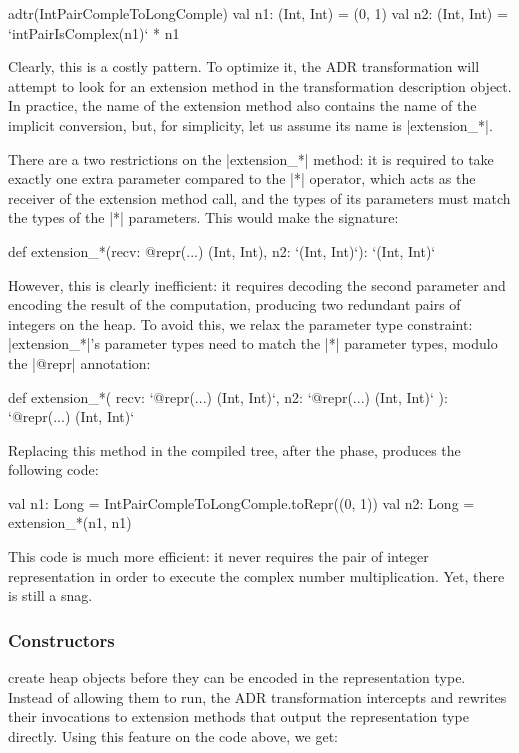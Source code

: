 \begin{lstlisting-nobreak}
adtr(IntPairCompleToLongComple) {
  val n1: (Int, Int) = (0, 1)
  val n2: (Int, Int) = `intPairIsComplex(n1)` * n1
}
\end{lstlisting-nobreak}

Clearly, this is a costly pattern. To optimize it, the ADR transformation will attempt to look for an extension method in the transformation description object. In practice, the name of the extension method also contains the name of the implicit conversion, but, for simplicity, let us assume its name is |extension_*|.

There are a two restrictions on the |extension_*| method: it is required to take exactly one extra parameter compared to the |*| operator, which acts as the receiver of the extension method call, and the types of its parameters must match the types of the |*| parameters. This would make the signature:

\begin{lstlisting-nobreak}
def extension_*(recv: @repr(...) (Int, Int), n2: `(Int, Int)`): `(Int, Int)`
\end{lstlisting-nobreak}

However, this is clearly inefficient: it requires decoding the second parameter and encoding the result of the computation, producing two redundant pairs of integers on the heap. To avoid this, we relax the parameter type constraint: |extension_*|'s parameter types need to match the |*| parameter types, modulo the |@repr| annotation:

\begin{lstlisting-nobreak}
def extension_*(
    recv: `@repr(...) (Int, Int)`,
    n2:   `@repr(...) (Int, Int)`
  ): `@repr(...) (Int, Int)`
\end{lstlisting-nobreak}

Replacing this method in the compiled tree, after the \commit{} phase, produces the following code:

\begin{lstlisting-nobreak}
val n1: Long = IntPairCompleToLongComple.toRepr((0, 1))
val n2: Long = extension_*(n1, n1)
\end{lstlisting-nobreak}

This code is much more efficient: it never requires the pair of integer representation in order to execute the complex number multiplication. Yet, there is still a snag.

\subsubsection{Constructors} create heap objects before they can be encoded in the representation type. Instead of allowing them to run, the ADR transformation intercepts and rewrites their invocations to extension methods that output the representation type directly. Using this feature on the code above, we get:

